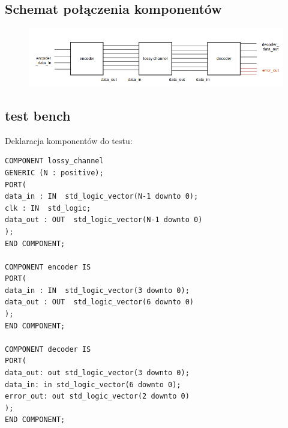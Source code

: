 \documentclass[a4paper,11pt]{article}
\begin{document}
			\subsection{Schemat połączenia komponentów}
				\begin{figure}[H]
					\centering
					\includegraphics[width=16cm]{flowschema}
				\end{figure}
			\subsection{test bench}
			Deklaracja komponentów do testu:
				\begin{verbatim}
COMPONENT lossy_channel
GENERIC (N : positive);
PORT(
data_in : IN  std_logic_vector(N-1 downto 0);
clk : IN  std_logic;
data_out : OUT  std_logic_vector(N-1 downto 0)
);
END COMPONENT;

COMPONENT encoder IS
PORT(
data_in : IN  std_logic_vector(3 downto 0);
data_out : OUT  std_logic_vector(6 downto 0)
);
END COMPONENT;

COMPONENT decoder IS
PORT(
data_out: out std_logic_vector(3 downto 0);
data_in: in std_logic_vector(6 downto 0);
error_out: out std_logic_vector(2 downto 0)
);
END COMPONENT;
	
				\end{verbatim}
\end{document}
